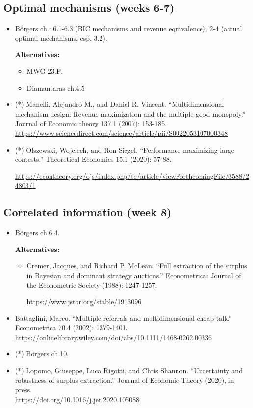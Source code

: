 \documentclass{article}
\begin{document}
\subsection{Optimal mechanisms (weeks 6-7)}
\begin{itemize}
	\item B{\"o}rgers ch.: 6.1-6.3 (BIC mechanisms and revenue equivalence), 2-4 (actual optimal mechanisms, esp. 3.2).
	
	\textbf{Alternatives:}
	\begin{itemize}
		\item MWG 23.F.
		\item Diamantaras ch.4.5
	\end{itemize}
	\item (*) Manelli, Alejandro M., and Daniel R. Vincent. ``Multidimensional mechanism design: Revenue maximization and the multiple-good monopoly.'' Journal of Economic theory 137.1 (2007): 153-185. \url{https://www.sciencedirect.com/science/article/pii/S0022053107000348}
	\item (*) Olszewski, Wojciech, and Ron Siegel. ``Performance‐maximizing large contests.'' Theoretical Economics 15.1 (2020): 57-88.
	
	\url{https://econtheory.org/ojs/index.php/te/article/viewForthcomingFile/3588/24803/1}
\end{itemize}

\subsection{Correlated information (week 8)}
\begin{itemize}
	\item B{\"o}rgers ch.6.4.
	
	\textbf{Alternatives:}
	\begin{itemize}
		\item Cremer, Jacques, and Richard P. McLean. ``Full extraction of the surplus in Bayesian and dominant strategy auctions.'' Econometrica: Journal of the Econometric Society (1988): 1247-1257.
		
		\url{https://www.jstor.org/stable/1913096}
	\end{itemize}
	\item Battaglini, Marco. ``Multiple referrals and multidimensional cheap talk.'' Econometrica 70.4 (2002): 1379-1401. \url{https://onlinelibrary.wiley.com/doi/abs/10.1111/1468-0262.00336}
	
	\item (*) B{\"o}rgers ch.10.
	
	\item (*) Lopomo, Giuseppe, Luca Rigotti, and Chris Shannon. ``Uncertainty and robustness of surplus extraction.'' Journal of Economic Theory (2020), in press. \\
	\url{https://doi.org/10.1016/j.jet.2020.105088}
\end{itemize}
\end{document}
